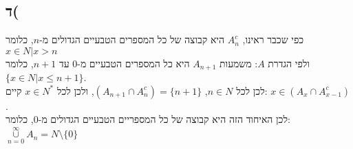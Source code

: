 \documentclass{article}
\begin{document}
\subsection*{ד(}
כפי שכבר ראינו, $A_n^{c}$ היא קבוצה של כל המספרים הטבעיים הגדולים מ-$n$, כלומר ${x \in  N | x > n}$\\
ולפי הגדרת $A$: משמעות $A_{n+1}$ היא כל המספרים הטבעיים מ-0 עד $n+1$, כלומר $\{x \in N | x \le n+1\}$.\\
לכן לכל $n \in N$, $(A_{n+1} \cap A_n^{c}) = \{n+1\}$, ולכן לכל $x \in N^{*}$ 
קיים: $x \in  (A_{x} \cap A_{x-1}^{c})$.\\
לכן האיחוד הזה היא קבוצה של כל המספריים הטבעיים הגדולים מ-0, כלומר:\\
$ \underset{n=0}{\overset{\infty}{\cup }} A_n = N \setminus \{0\}$
\end{document}
